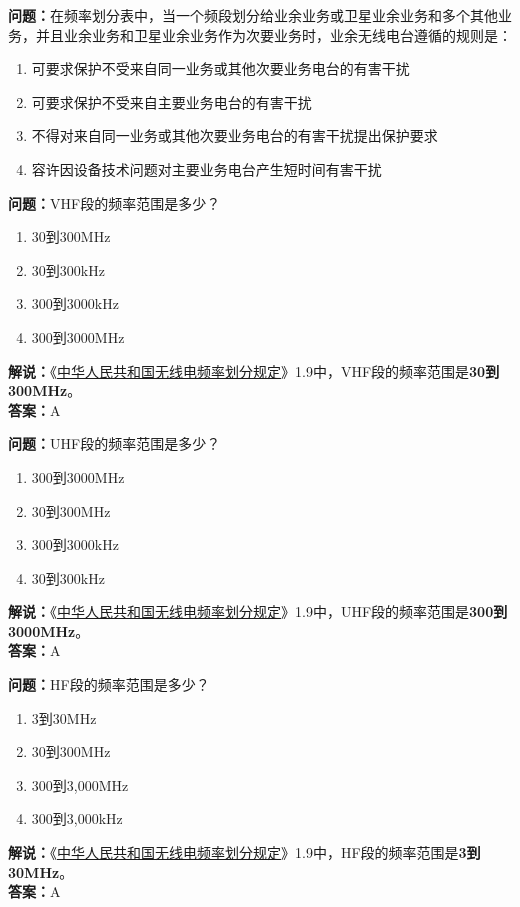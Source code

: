 \textbf{问题：}在频率划分表中，当一个频段划分给业余业务或卫星业余业务和多个其他业务，并且业余业务和卫星业余业务作为次要业务时，业余无线电台遵循的规则是：
\begin{enumerate}[label=\Alph*), leftmargin=1cm]
	\item 可要求保护不受来自同一业务或其他次要业务电台的有害干扰
	\item 可要求保护不受来自主要业务电台的有害干扰
	\item 不得对来自同一业务或其他次要业务电台的有害干扰提出保护要求
	\item 容许因设备技术问题对主要业务电台产生短时间有害干扰
\end{enumerate}

\textbf{问题：}VHF段的频率范围是多少？
\begin{enumerate}[label=\Alph*), leftmargin=1cm]
	\item 30到300MHz
	\item 30到300kHz
	\item 300到3000kHz
	\item 300到3000MHz
\end{enumerate}
\textbf{解说：}《\href{https://www.miit.gov.cn/zwgk/zcwj/wjfb/txy/art/2020/art_066386284cd2449493586c81ccafed11.html}{中华人民共和国无线电频率划分规定}》1.9中，VHF段的频率范围是\textbf{30到300MHz}。\\\textbf{答案：}A

\textbf{问题：}UHF段的频率范围是多少？
\begin{enumerate}[label=\Alph*), leftmargin=1cm]
	\item 300到3000MHz
	\item 30到300MHz
	\item 300到3000kHz
	\item 30到300kHz
\end{enumerate}
\textbf{解说：}《\href{https://www.miit.gov.cn/zwgk/zcwj/wjfb/txy/art/2020/art_066386284cd2449493586c81ccafed11.html}{中华人民共和国无线电频率划分规定}》1.9中，UHF段的频率范围是\textbf{300到3000MHz}。\\\textbf{答案：}A

\textbf{问题：}HF段的频率范围是多少？
\begin{enumerate}[label=\Alph*), leftmargin=1cm]
	\item 3到30MHz
	\item 30到300MHz
	\item 300到3,000MHz
	\item 300到3,000kHz
\end{enumerate}
\textbf{解说：}《\href{https://www.miit.gov.cn/zwgk/zcwj/wjfb/txy/art/2020/art_066386284cd2449493586c81ccafed11.html}{中华人民共和国无线电频率划分规定}》1.9中，HF段的频率范围是\textbf{3到30MHz}。\\\textbf{答案：}A

